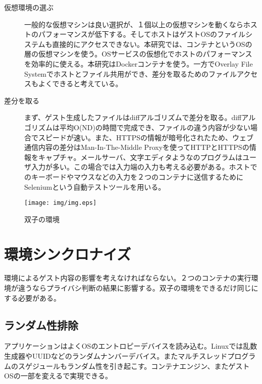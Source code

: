 \documentclass[a4paper,twocolumn,10pt]{jarticle}
\begin{document}
\begin{description}
 \item[仮想環境の選ぶ]\mbox{}

一般的な仮想マシンは良い選択が、１個以上の仮想マシンを動くならホストのパフォーマンスが低下する。そしてホストはゲストOSのファイルシステムも直接的にアクセスできない。本研究では、コンテナというOSの層の仮想マシンを使う。OSサービスの仮想化でホストのパフォーマンスを効率的に使える。本研究はDocker\cite{docker}コンテナを使う。一方でOverlay File Systemでホストとファイル共用ができ、差分を取るためのファイルアクセスもよくできると考えている。
\end{description}
\begin{description}


\item[差分を取る]\mbox{}

まず、ゲスト生成したファイルはdiffアルゴリズムで差分を取る。diff\cite{diff}アルゴリズムは平均O(ND)の時間で完成でき、ファイルの違う内容が少ない場合でスピードが速い。また、HTTPSの情報が暗号化されたため、ウェブ通信内容の差分はMan-In-The-Middle Proxy\cite{mitm}を使ってHTTPとHTTPSの情報をキャプチャ。メールサーバ、文字エディタようなのプログラムはユーザ入力が多い。この場合では入力端の入力も考える必要がある。ホストでのキーボードやマウスなどの入力を２つのコンテナに送信するためにSelenium\cite{selenium}という自動テストツールを用いる。
\end{description}


\begin{figure}[t]
\begin{center}
\texttt{[image: img/img.eps]}
\caption{双子の環境}
\label{figure:twin}
\end{center}
\end{figure}





\section{環境シンクロナイズ}
環境によるゲスト内容の影響を考えなければならない。２つのコンテナの実行環境が違うならプライバシ判断の結果に影響する。双子の環境をできるだけ同じにする必要がある。
\subsection{ランダム性排除}
アプリケーションはよくOSのエントロピーデバイスを読み込む。Linuxでは乱数生成器やUUIDなどのランダムナンバーデバイス。またマルチスレッドプログラムのスゲジュールもランダム性を引き起こす。コンテナエンジン、またゲストOSの一部を変えるで実現できる。
\end{document}
